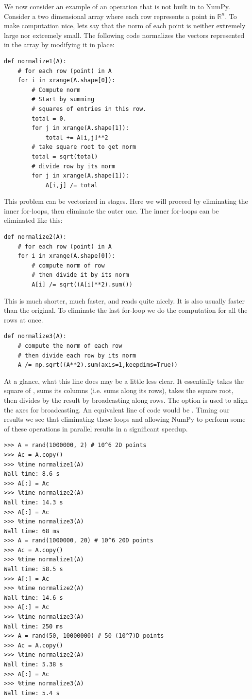 We now consider an example of an operation that is not built in to NumPy.
Consider a two dimensional array where each row represents a point in $\mathbb{R}^n$.
To make computation nice, lets say that the norm of each point is neither extremely large nor extremely small.
The following code normalizes the vectors represented in the array by modifying it in place:
\begin{lstlisting}
def normalize1(A):
    # for each row (point) in A
    for i in xrange(A.shape[0]):
        # Compute norm
        # Start by summing
        # squares of entries in this row.
        total = 0.
        for j in xrange(A.shape[1]):
            total += A[i,j]**2
        # take square root to get norm
        total = sqrt(total)
        # divide row by its norm
        for j in xrange(A.shape[1]):
            A[i,j] /= total
\end{lstlisting}
This problem can be vectorized in stages.
Here we will proceed by eliminating the inner for-loops, then eliminate the outer one.
The inner for-loops can be eliminated like this:
\begin{lstlisting}
def normalize2(A):
    # for each row (point) in A
    for i in xrange(A.shape[0]):
        # compute norm of row
        # then divide it by its norm
        A[i] /= sqrt((A[i]**2).sum())
\end{lstlisting}
This is much shorter, much faster, and reads quite nicely.
It is also usually faster than the original.
To eliminate the last for-loop we do the computation for all the rows at once.
\begin{lstlisting}
def normalize3(A):
    # compute the norm of each row
    # then divide each row by its norm
    A /= np.sqrt((A**2).sum(axis=1,keepdims=True))
\end{lstlisting}
At a glance, what this line does may be a little less clear.
It essentially takes the square of , sums its columns (i.e. sums along its rows), takes the square root, then divides  by the result by broadcasting along rows.
The  option is used to align the axes for broadcasting.
An equivalent line of code would be .
Timing our results we see that eliminating these loops and allowing NumPy to perform some of these operations in parallel results in a significant speedup.
\begin{lstlisting}
>>> A = rand(1000000, 2) # 10^6 2D points
>>> Ac = A.copy()
>>> %time normalize1(A)
Wall time: 8.6 s
>>> A[:] = Ac
>>> %time normalize2(A)
Wall time: 14.3 s
>>> A[:] = Ac
>>> %time normalize3(A)
Wall time: 68 ms
>>> A = rand(1000000, 20) # 10^6 20D points
>>> Ac = A.copy()
>>> %time normalize1(A)
Wall time: 58.5 s
>>> A[:] = Ac
>>> %time normalize2(A)
Wall time: 14.6 s
>>> A[:] = Ac
>>> %time normalize3(A)
Wall time: 250 ms
>>> A = rand(50, 10000000) # 50 (10^7)D points
>>> Ac = A.copy()
>>> %time normalize2(A)
Wall time: 5.38 s
>>> A[:] = Ac
>>> %time normalize3(A)
Wall time: 5.4 s
\end{lstlisting}
